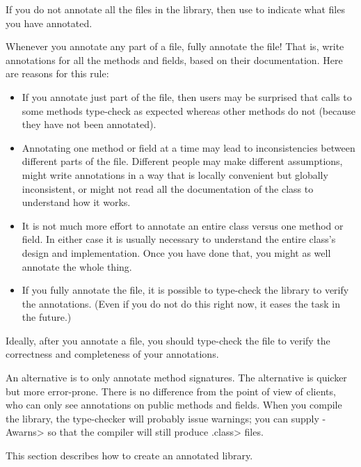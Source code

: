 If you do not annotate all the files in the library, then use
 to indicate what files you have
annotated.

Whenever you annotate any part of a file, fully annotate the file!  That
is, write annotations for all the methods and fields, based on their
documentation.  Here are reasons for this rule:

\begin{itemize}
\item
  If you annotate just part of the file, then users may be surprised that
  calls to some methods type-check as expected whereas other methods do not
  (because they have not been annotated).
\item
  Annotating one method or field at a time may lead to inconsistencies
  between different parts of the file.  Different people may make different
  assumptions, might write annotations in a way that is locally convenient
  but globally inconsistent, or might not read all the documentation of the
  class to understand how it works.
\item
  It is not much more effort to annotate an entire class versus one method
  or field.  In either case it is usually necessary to understand the entire
  class's design and implementation.  Once you have done that, you might as
  well annotate the whole thing.
\item
  If you fully annotate the file, it is possible to type-check the library to
  verify the annotations.  (Even if you do not do this right now, it eases
  the task in the future.)
\end{itemize}



Ideally, after you annotate a file, you should type-check the file to verify
the correctness and completeness of your annotations.

An alternative is to
only annotate method signatures.  The alternative is quicker but more
error-prone.  There is no difference from the point of view of clients,
who can only see annotations on public methods and fields.  When you
compile the library, the type-checker will probably issue warnings; you can
supply \<-Awarns> so that the
compiler will still produce \<.class> files.



This section describes how to create an annotated library.

